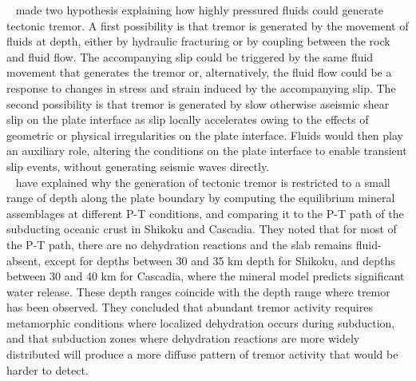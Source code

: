 \documentclass[draft]{agujournal2019}
\begin{document}
~ made two hypothesis explaining how highly pressured fluids could generate tectonic tremor. A first possibility is that tremor is generated by the movement of fluids at depth, either by hydraulic fracturing or by coupling between the rock and fluid flow. The accompanying slip could be triggered by the same fluid movement that generates the tremor or, alternatively, the fluid flow could be a response to changes in stress and strain induced by the accompanying slip. The second possibility is that tremor is generated by slow otherwise aseismic shear slip on the plate interface as slip locally accelerates owing to the effects of geometric or physical irregularities on the plate interface. Fluids would then play an auxiliary role, altering the conditions on the plate interface to enable transient slip events, without generating seismic waves directly. \\

~ have explained why the generation of tectonic tremor is restricted to a small range of depth along the plate boundary by computing the equilibrium mineral assemblages at different P-T conditions, and comparing it to the P-T path of the subducting oceanic crust in Shikoku and Cascadia. They noted that for most of the P-T path, there are no dehydration reactions and the slab remains fluid-absent, except for depths between 30 and 35 km depth for Shikoku, and depths between 30 and 40 km for Cascadia, where the mineral model predicts significant water release. These depth ranges coincide with the depth range where tremor has been observed. They concluded that abundant tremor activity requires metamorphic conditions where localized dehydration occurs during subduction, and that subduction zones where dehydration reactions are more widely distributed will produce a more diffuse pattern of tremor activity that would be harder to detect. \\
\end{document}

